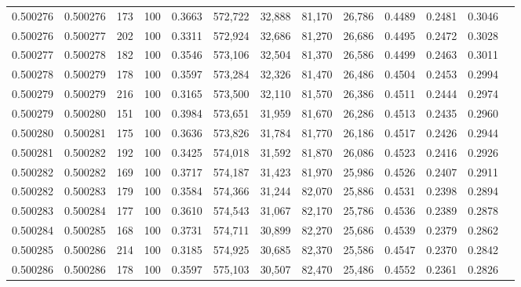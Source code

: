 \begin{tabular}{rrrrrrrrrrrrr}
0.500276 & 0.500276 &   173 & 100 &                                     0.3663 & 572,722 &  32,888 &  81,170 &  26,786 & 0.4489 & 0.2481 & 0.3046 \\
0.500276 & 0.500277 &   202 & 100 &                                     0.3311 & 572,924 &  32,686 &  81,270 &  26,686 & 0.4495 & 0.2472 & 0.3028 \\
0.500277 & 0.500278 &   182 & 100 &                                     0.3546 & 573,106 &  32,504 &  81,370 &  26,586 & 0.4499 & 0.2463 & 0.3011 \\
0.500278 & 0.500279 &   178 & 100 &                                     0.3597 & 573,284 &  32,326 &  81,470 &  26,486 & 0.4504 & 0.2453 & 0.2994 \\
0.500279 & 0.500279 &   216 & 100 &                                     0.3165 & 573,500 &  32,110 &  81,570 &  26,386 & 0.4511 & 0.2444 & 0.2974 \\
0.500279 & 0.500280 &   151 & 100 &                                     0.3984 & 573,651 &  31,959 &  81,670 &  26,286 & 0.4513 & 0.2435 & 0.2960 \\
0.500280 & 0.500281 &   175 & 100 &                                     0.3636 & 573,826 &  31,784 &  81,770 &  26,186 & 0.4517 & 0.2426 & 0.2944 \\
0.500281 & 0.500282 &   192 & 100 &                                     0.3425 & 574,018 &  31,592 &  81,870 &  26,086 & 0.4523 & 0.2416 & 0.2926 \\
0.500282 & 0.500282 &   169 & 100 &                                     0.3717 & 574,187 &  31,423 &  81,970 &  25,986 & 0.4526 & 0.2407 & 0.2911 \\
0.500282 & 0.500283 &   179 & 100 &                                     0.3584 & 574,366 &  31,244 &  82,070 &  25,886 & 0.4531 & 0.2398 & 0.2894 \\
0.500283 & 0.500284 &   177 & 100 &                                     0.3610 & 574,543 &  31,067 &  82,170 &  25,786 & 0.4536 & 0.2389 & 0.2878 \\
0.500284 & 0.500285 &   168 & 100 &                                     0.3731 & 574,711 &  30,899 &  82,270 &  25,686 & 0.4539 & 0.2379 & 0.2862 \\
0.500285 & 0.500286 &   214 & 100 &                                     0.3185 & 574,925 &  30,685 &  82,370 &  25,586 & 0.4547 & 0.2370 & 0.2842 \\
0.500286 & 0.500286 &   178 & 100 &                                     0.3597 & 575,103 &  30,507 &  82,470 &  25,486 & 0.4552 & 0.2361 & 0.2826 \\

\end{tabular}
